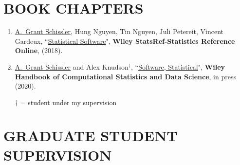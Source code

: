 \documentclass[paper=a4,fontsize=11pt]{scrartcl} %
\newcommand{\NewPart}[2]{\section*{\uppercase{#1} #2 }}
\newcommand{\PaperEntry}[7]{
		\noindent #1, ``\href{#7}{#2}", \textit{#3} \textbf{#4}, #5 (#6).}
\begin{document}

\NewPart{Book chapters}{}
\vspace{-7pt}
\begin{enumerate}


 \item \PaperEntry{\underline{A.~Grant Schissler}, Hung Nguyen, Tin Nguyen, Juli Petereit, Vincent Gardeux}{Statistical Software}{}{Wiley StatsRef-Statistics Reference Online}{}{2018}{}

\item \PaperEntry{\underline{A.~Grant Schissler} and Alex Knudson$^{\dagger}$}{Software, Statistical}{}{Wiley Handbook of Computational Statistics and Data Science}{in press}{2020}{}

  $\dagger$ = student under my supervision
   
\end{enumerate}



\NewPart{Graduate student supervision}{}
\vspace{7pt}

\end{document}
